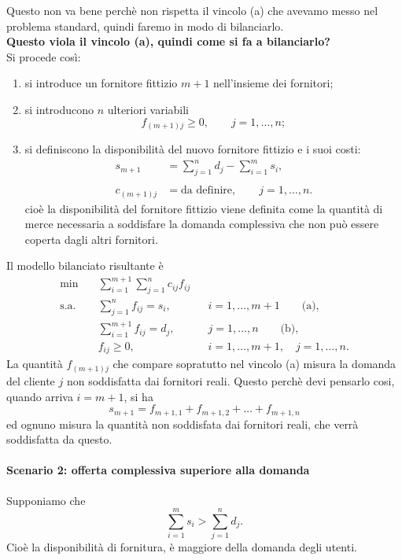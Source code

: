Questo non va bene perchè non rispetta il vincolo (a) che avevamo messo nel problema standard, quindi faremo in modo di bilanciarlo. 
\\
\textbf{Questo viola il vincolo (a), quindi come si fa a bilanciarlo?}
\\
Si procede così:
\begin{enumerate}
\item si introduce un fornitore fittizio \(m+1\) nell'insieme dei fornitori;
\item si introducono \(n\) ulteriori variabili
\[
f_{(m+1)j}\geq0,\qquad j=1,\ldots,n;
\]
\item si definiscono la disponibilità del nuovo fornitore fittizio e i suoi costi:
\[
\begin{aligned}
s_{m+1} &= \sum_{j=1}^n d_j-\sum_{i=1}^m s_i,
\\
\\[6pt]
c_{(m+1)j} &= \text{da definire},\qquad j=1,\ldots,n.
\end{aligned}
\]
cioè la disponibilità del fornitore fittizio viene definita come la quantità di merce necessaria a soddisfare la domanda complessiva che non può essere coperta dagli altri fornitori.
\end{enumerate}
Il modello bilanciato risultante è
\begin{align*}
\min\quad &\sum_{i=1}^{m+1}\sum_{j=1}^n c_{ij}f_{ij}\\
\text{s.a.}\quad
&\sum_{j=1}^n f_{ij}=s_i,
&&i=1,\ldots,m+1 \qquad\text{(a)},\\
&\sum_{i=1}^{m+1}f_{ij}=d_j,
&&j=1,\ldots,n \qquad\text{(b)},\\
&f_{ij}\geq0,
&&i=1,\ldots,m+1,\quad j=1,\ldots,n.
\end{align*}
La quantità \(f_{(m+1)j}\) che compare sopratutto nel vincolo (a) misura la domanda del cliente \(j\)
non soddisfatta dai fornitori reali. Questo perchè devi pensarlo cosi, quando arriva $i=m+1$, si ha
\[
s_{m+1} = f_{m+1,1} + f_{m+1,2} + \dots + f_{m+1,n}
\]
ed ognuno misura la quantità non soddisfata dai fornitori reali, che verrà soddisfatta da questo.


\newpage

\paragraph{Scenario 2: offerta complessiva superiore alla domanda}
Supponiamo che
\[
\sum_{i=1}^m s_i>\sum_{j=1}^n d_j.
\]
Cioè la disponibilità di fornitura, è maggiore della domanda degli utenti.


